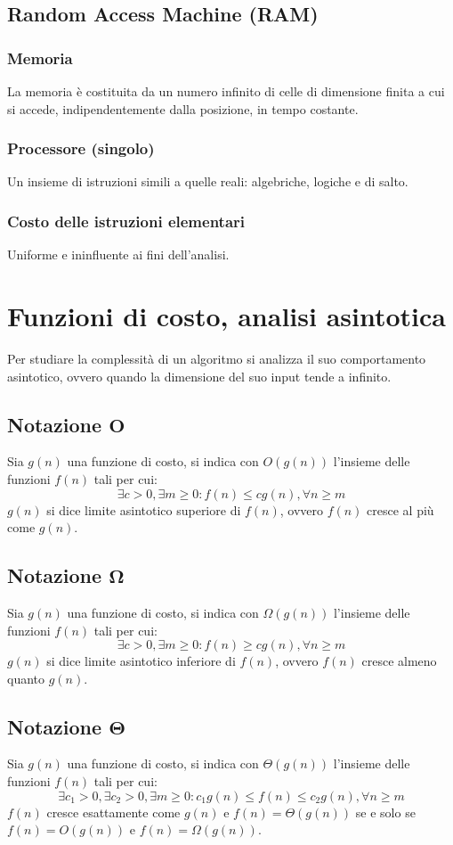 \subsection{Random Access Machine (RAM)}
\subsubsection{Memoria}
La memoria \`e costituita da un numero infinito di celle di dimensione finita a cui si accede, indipendentemente dalla posizione, in tempo costante.
\subsubsection{Processore (singolo)}
Un insieme di istruzioni simili a quelle reali: algebriche, logiche e di salto.
\subsubsection{Costo delle istruzioni elementari}
Uniforme e ininfluente ai fini dell'analisi. 
\section{Funzioni di costo, analisi asintotica}
Per studiare la complessit\`a di un algoritmo si analizza il suo comportamento asintotico, ovvero quando la dimensione del suo input tende a infinito.
\subsection{Notazione $\mathbf{O}$}
Sia $g(n)$ una funzione di costo, si indica con $O(g(n))$ l'insieme delle funzioni $f(n)$ tali per cui:
\begin{equation*}
\exists c>0,\exists m\ge 0: f(n)\le cg(n),\forall n\ge m
\end{equation*}
$g(n)$ si dice limite asintotico superiore di $f(n)$, ovvero $f(n)$ cresce al pi\`u come $g(n)$.
\subsection{Notazione $\mathbf{\Omega}$}
Sia $g(n)$ una funzione di costo, si indica con $\Omega(g(n))$ l'insieme delle funzioni $f(n)$ tali per cui:
\begin{equation*}
\exists c>0,\exists m\ge 0: f(n)\ge cg(n),\forall n\ge m
\end{equation*}
$g(n)$ si dice limite asintotico inferiore di $f(n)$, ovvero $f(n)$ cresce almeno quanto $g(n)$.
\subsection{Notazione $\mathbf{\Theta}$}
Sia $g(n)$ una funzione di costo, si indica con $\Theta(g(n))$ l'insieme delle funzioni $f(n)$ tali per cui:
\begin{equation*}
\exists c_1>0,\exists c_2>0,\exists m\ge 0: c_1g(n)\le f(n)\le c_2g(n),\forall n\ge m
\end{equation*}
$f(n)$ cresce esattamente come $g(n)$ e $f(n)=\Theta(g(n))$ se e solo se $f(n)=O(g(n))$ e $f(n)=\Omega(g(n))$.
